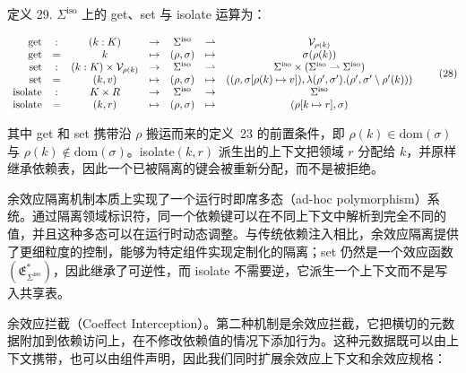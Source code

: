 定义 29. \(\Sigma ^ { \mathrm { i s o } }\) 上的 get、set 与 isolate 运算为：

\[
\begin{array} { r c c c c c c } { \mathrm { g e t } } & { : } & { ( k : K ) } & { \to } & { \Sigma ^ { \mathrm { i s o } } } & { \rightharpoonup } & { \mathcal { V } _ { \rho ( k ) } } \\ { \mathrm { g e t } } & { = } & { k } & { \mapsto } & { ( \rho , \sigma ) } & { \mapsto } & { \sigma ( \rho ( k ) ) } \\ { \mathrm { s e t } } & { : } & { ( k : K ) \times \mathcal { V } _ { \rho ( k ) } } & { \to } & { \Sigma ^ { \mathrm { i s o } } } & { \rightharpoonup } & { \Sigma ^ { \mathrm { i s o } } \times ( \Sigma ^ { \mathrm { i s o } } \rightharpoonup \Sigma ^ { \mathrm { i s o } } ) } \\ { \mathrm { s e t } } & { = } & { ( k , v ) } & { \mapsto } & { ( \rho , \sigma ) } & { \mapsto } & { ( ( \rho , \sigma [ \rho ( k ) \mapsto v ] ) , \lambda ( \rho ^ { \prime } , \sigma ^ { \prime } ) . ( \rho ^ { \prime } , \sigma ^ { \prime } \setminus \rho ^ { \prime } ( k ) ) ) } \\ { \mathrm { i s o l a t e } } & { : } & { K \times R } & { \to } & { \Sigma ^ { \mathrm { i s o } } } & { \to } & { \Sigma ^ { \mathrm { i s o } } } \\ { \mathrm { i s o l a t e } } & { = } & { ( k , r ) } & { \mapsto } & { ( \rho , \sigma ) } & { \mapsto } & { ( \rho [ k \mapsto r ] , \sigma ) } \end{array}\tag{28}
\]

其中 get 和 set 携带沿 \(\rho\) 搬运而来的定义~23 的前置条件，即 \(\rho ( k ) \in \mathrm { d o m } ( \sigma )\) 与 \(\rho ( k ) \notin \mathrm { d o m } ( \sigma )\)。isolate\(( k , r )\) 派生出的上下文把领域 \(r\) 分配给 \(k\)，并原样继承依赖表，因此一个已被隔离的键会被重新分配，而不是被拒绝。

余效应隔离机制本质上实现了一个运行时即席多态（ad-hoc polymorphism）系统。通过隔离领域标识符，同一个依赖键可以在不同上下文中解析到完全不同的值，并且这种多态可以在运行时动态调整。与传统依赖注入相比，余效应隔离提供了更细粒度的控制，能够为特定组件实现定制化的隔离；set 仍然是一个效应函数 \(\left( \mathfrak { E } _ { \Sigma ^ { \mathrm { { i s o } } } } ^ { * } \right)\)，因此继承了可逆性，而 isolate 不需要逆，它派生一个上下文而不是写入共享表。

余效应拦截（Coeffect Interception）。第二种机制是余效应拦截，它把横切的元数据附加到依赖访问上，在不修改依赖值的情况下添加行为。这种元数据既可以由上下文携带，也可以由组件声明，因此我们同时扩展余效应上下文和余效应规格：

